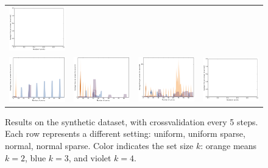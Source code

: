 \documentclass{article}
\renewcommand\[{\begin{equation}}
\renewcommand\]{\end{equation}}
\begin{document}
\begin{figure}[b]
\begin{tabular}{cccc}
        \includegraphics[width=12em]{figures/synthetic_6_normal_cv5_time}
        \\
        \includegraphics[width=12em]{figures/synthetic_3_normal_sparse_cv5_time} &
        \includegraphics[width=12em]{figures/synthetic_4_normal_sparse_cv5_time} &
        \includegraphics[width=12em]{figures/synthetic_5_normal_sparse_cv5_time} &
        \includegraphics[width=12em]{figures/synthetic_6_normal_sparse_cv5_time}
    \end{tabular}
    \caption{Results on the synthetic dataset, with crossvalidation every 5 steps. Each row represents a different
    setting: uniform, uniform sparse, normal, normal sparse. Color indicates
    the set size $k$: orange means $k=2$, blue $k=3$, and violet $k=4$.}
\end{figure}

\twocolumn
\end{document}
